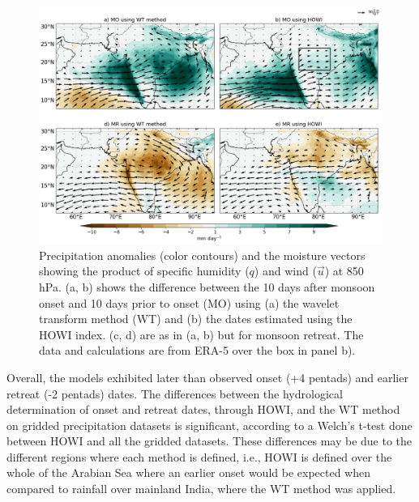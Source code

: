 \begin{figure}[t!]
\centering
 \includegraphics[width=0.95\linewidth]{figures/wav_fig8.png}
\caption[Precipitation anomalies during Indian monsoon onset]{  Precipitation anomalies (color contours) and the moisture vectors showing the product of specific humidity ($q$) and wind ($\vec{u}$) at 850 hPa. (a, b) shows the difference between the 10 days after monsoon onset and 10 days prior to onset (MO) using (a) the wavelet transform method (WT) and (b) the dates estimated using the HOWI index. (c, d) are as in (a, b) but for monsoon retreat. The data and calculations are from ERA-5 over the box in panel b). }
\label{fig:wav_fig8}
\end{figure}

Overall, the models exhibited later than observed onset (+4 pentads) and earlier retreat  (-2 pentads) dates. The differences between the hydrological determination of onset and retreat dates, through HOWI, and the WT method on gridded precipitation datasets is significant, according to a Welch's t-test done between HOWI and all the gridded datasets. These differences may be due to the different regions where each method is defined, i.e., HOWI is defined over the whole of the Arabian Sea where an earlier onset would be expected when compared to rainfall over mainland India, where the WT method was applied. 

